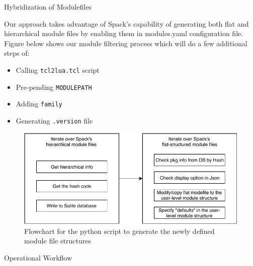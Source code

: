 \documentclass[final]{beamer}
\newlength{\onecolwid}
\begin{document}
\begin{frame}[t]
\begin{columns}[t]
\begin{column}{\onecolwid}
\begin{block}{Hybridization of Modulefiles}

Our approach takes advantage of Spack's capability of generating both flat and hierarchical module files by enabling them in modules.yaml configuration file. Figure below shows our module filtering process which will do a few additional steps of:

\setlength{\leftmargini}{9.5cm}
\setlength{\leftmarginii}{9.5cm}
\begin{itemize}
    \item Calling \texttt{tcl2lua.tcl} script
    \item Pre-pending \texttt{MODULEPATH} 
    \item Adding \texttt{family} 
    \item Generating \texttt{.version} file
\end{itemize}

\vspace{0.75em}
\begin{figure}
  \centerline{\includegraphics[width=0.8\linewidth]{figures/modulefilter_flowchart}}
  \caption{Flowchart for the python script to generate the newly defined module file structures}
\end{figure}

\end{block}


\vspace{-1em}
\begin{block}{Operational Workflow}


\end{block}
\end{column}
\end{columns}
\end{frame}
\end{document}
